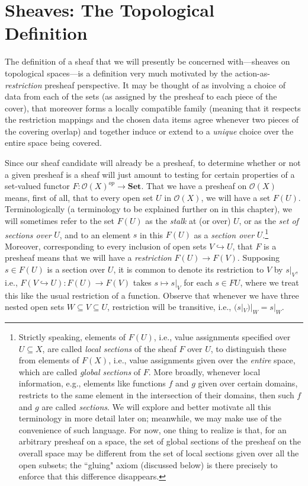 \documentclass[a4paper]{book}
\theoremstyle{definition}
\theoremstyle{definition}
\theoremstyle{definition}
\theoremstyle{theorem}
\theoremstyle{definition}
\begin{document}
		\section{Sheaves: The Topological Definition} 
		The definition of a sheaf that we will presently be concerned with---sheaves on topological spaces---is a definition very much motivated by the action-as-\textit{restriction} presheaf perspective. It may be thought of as involving a choice of data from each of the sets (as assigned by the presheaf to each piece of the cover), that moreover forms a locally compatible family (meaning that it respects the restriction mappings and the chosen data items agree whenever two pieces of the covering overlap) and together induce or extend to a \textit{unique} choice over the entire space being covered. \par 
		Since our sheaf candidate will already be a presheaf, to determine whether or not a given presheaf is a sheaf will just amount to testing for certain properties of a set-valued functor $F: \mathscr{O}(X)^{op} \rightarrow \textbf{Set}$. That we have a presheaf on $\mathscr{O}(X)$ means, first of all, that to every open set $U$ in $\mathscr{O}(X)$, we will have a set $F(U)$. Terminologically (a terminology to be explained further on in this chapter), we will sometimes refer to the set $F(U)$ as the \textit{stalk} at (or over) $U$, or as the \textit{set of sections over} $U$, and to an element $s$ in this $F(U)$ as a \textit{section over} $U$.\footnote{Strictly speaking, elements of $F(U)$, i.e., value assignments specified over $U \subseteq X$, are called \textit{local sections} of the sheaf $F$ over $U$, to distinguish these from elements of $F(X)$, i.e., value assignments given over the \textit{entire} space, which are called \textit{global sections} of $F$. More broadly, whenever local information, e.g., elements like functions $f$ and $g$ given over certain domains, restricts to the same element in the intersection of their domains, then such $f$ and $g$ are called \textit{sections}. We will explore and better motivate all this terminology in more detail later on; meanwhile, we may make use of the convenience of such language. For now, one thing to realize is that, for an arbitrary presheaf on a space, the set of global sections of the presheaf on the overall space may be different from the set of local sections given over all the open subsets; the ``gluing" axiom (discussed below) is there precisely to enforce that this difference disappears.} Moreover, corresponding to every inclusion of open sets $V \hookrightarrow U$, that $F$ is a presheaf means that we will have a \textit{restriction} $F(U) \rightarrow F(V)$. Supposing $s \in F(U)$ is a section over $U$, it is common to denote its restriction to $V$ by $s|_V$, i.e., $F(V \hookrightarrow U): F(U) \rightarrow F(V)$  takes $s \mapsto s|_V$ for each $s \in FU$, where we treat this like the usual restriction of a function. Observe that whenever we have three nested open sets $W \subseteq V \subseteq U$, restriction will be transitive, i.e., $(s|_V) |_W = s|_W$. \par 
\end{document}
